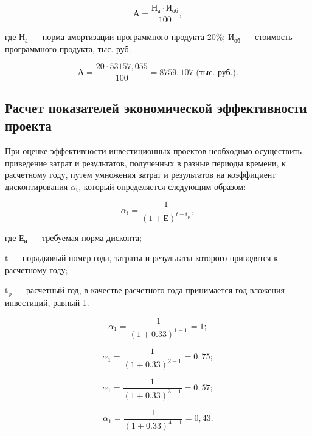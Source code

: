\begin{displaymath}
  \text{А} = \frac{\text{Н}_{\text{а}}\cdot\text{И}_{\text{об}}}{100},
\end{displaymath}

где \(\text{Н}_{\text{а}}\) --- норма амортизации программного продукта 20\%;
\(\text{И}_{\text{об}}\) --- стоимость программного продукта, тыс. руб.

\begin{displaymath}
  \text{А} = \frac{20\cdot53157,055}{100} = 8759,107 \text{ (тыс. руб.)}.
\end{displaymath}

\subsection{Расчет показателей экономической эффективности проекта}

При оценке эффективности инвестиционных проектов необходимо осуществить приведение затрат и результатов, полученных в разные периоды времени, к  расчетному году,  путем умножения затрат и результатов на коэффициент дисконтирования \(\alpha_{\text{t}}\), который определяется следующим образом:

\begin{displaymath}
  \alpha_{\text{t}} = \frac{1}{(1+\text{Е})^{t-\text{t}_{\text{p}}}},
\end{displaymath}

где \(\text{Е}_{\text{н}}\) --- требуемая норма дисконта;  

\(\text{t}\) --- порядковый номер года, затраты и результаты которого приводятся к расчетному году;

\(\text{t}_{\text{p}}\) --- расчетный год, в качестве расчетного года принимается год вложения инвестиций, равный 1.

\begin{displaymath}
  \alpha_{\text{1}} = \frac{1}{(1+0.33)^{1-1}} = 1;
\end{displaymath}

\begin{displaymath}
  \alpha_{\text{1}} = \frac{1}{(1+0.33)^{2-1}} = 0,75;
\end{displaymath}

\begin{displaymath}
  \alpha_{\text{1}} = \frac{1}{(1+0.33)^{3-1}} = 0,57;
\end{displaymath}

\begin{displaymath}
  \alpha_{\text{1}} = \frac{1}{(1+0.33)^{4-1}} = 0,43.
\end{displaymath}

